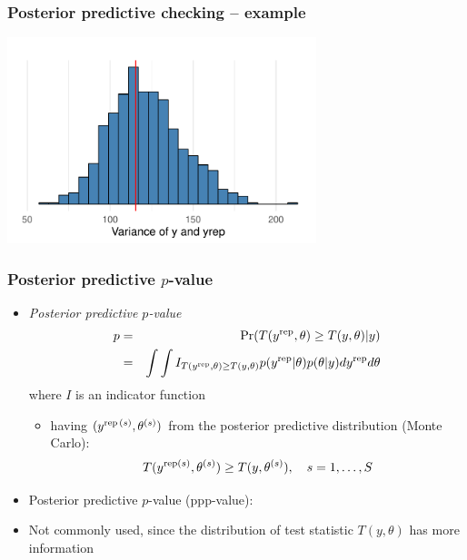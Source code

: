 \documentclass[10pt]{beamer}
\begin{document}
\begin{frame}[fragile]

\frametitle{Posterior predictive checking -- example}

  \includegraphics[width=9cm]{figs/light_ppc_var.pdf}

\end{frame}


\begin{frame}[fragile]

\frametitle{Posterior predictive $p$-value}

  \begin{itemize}
  \item<1-> \textit{Posterior predictive $p$-value}
    \begin{eqnarray*}
      p & = & \Pr(T(y^{\operatorname{\mathrm{rep}}},\theta)\geq T(y,\theta)|y)\\
      & = & \int\int
      I_{T(y^{\operatorname{\mathrm{rep}}},\theta)\geq T(y,\theta)}p(y^{\operatorname{\mathrm{rep}}}|\theta)p(\theta|y)dy^{\operatorname{\mathrm{rep}}}d\theta
    \end{eqnarray*}
    where $I$ is an indicator function
    \begin{itemize}
    \item<2-> having $(y^{\operatorname{\mathrm{rep}}\,(s)},\theta^{(s)})$ from the posterior predictive
      distribution (Monte Carlo):
      \begin{equation*}
        T(y^{\operatorname{\mathrm{rep}} (s)},\theta^{(s)})\geq T(y,\theta^{(s)}), \quad s=1,\ldots,S
      \end{equation*}
    \end{itemize}
    \vspace{-1.5\baselineskip}
  \item<3-> Posterior predictive $p$-value (ppp-value):\\
  \item<4-> Not commonly used, since the distribution of test
    statistic $T(y,\theta)$ has more information
  \end{itemize}

\end{frame}
\end{document}
